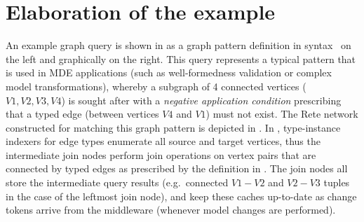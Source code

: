 \section{Elaboration of the example}
\label{sec:elaboration}

An example graph query is shown in  %
as a graph pattern definition in \eiq{} syntax~\cite{Bergmann:2010:IEM:1926458.1926467} on the left and graphically on the right. This query represents a typical pattern that is used in MDE applications (such as well-formedness validation or complex model transformations), whereby a subgraph of 4 connected vertices ($V1, V2, V3, V4$) is sought after with a \emph{negative application condition} prescribing that a typed edge (between vertices $V4$ and $V1$) must not exist.
The Rete network constructed for matching this graph pattern is depicted in . In \iqd{}, type-instance indexers for edge types enumerate all source and target vertices, thus the intermediate join nodes perform join operations on vertex pairs that are connected by typed edges as prescribed by the definition in . The join nodes all store the intermediate query results (e.g.\ connected $V1-V2$ and $V2-V3$ tuples in the case of the leftmost join node), and keep these caches up-to-date as change tokens arrive from the middleware (whenever model changes are performed).


